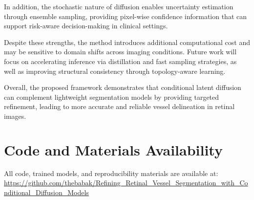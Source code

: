 \documentclass[journal,article,submit,pdftex,moreauthors]{Definitions/mdpi}
\begin{document}
In addition, the stochastic nature of diffusion enables uncertainty estimation through ensemble sampling, providing pixel-wise confidence information that can support risk-aware decision-making in clinical settings.

Despite these strengths, the method introduces additional computational cost and may be sensitive to domain shifts across imaging conditions. Future work will focus on accelerating inference via distillation and fast sampling strategies, as well as improving structural consistency through topology-aware learning.

Overall, the proposed framework demonstrates that conditional latent diffusion can complement lightweight segmentation models by providing targeted refinement, leading to more accurate and reliable vessel delineation in retinal images.


\section*{Code and Materials Availability}
All code, trained models, and reproducibility materials are available at:
\url{https://github.com/thebabak/Refining_Retinal_Vessel_Segmentation_with_Conditional_Diffusion_Models}

%


\end{document}
